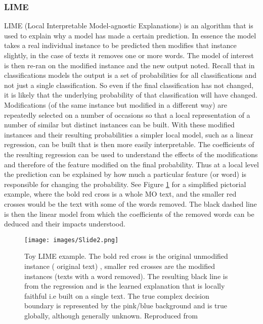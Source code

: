 \subsubsection{LIME} LIME (Local Interpretable Model-agnostic Explanations) \parencite{ribeiro2016should} is an algorithm that is used to explain why a model has made a certain prediction. In essence the model takes a real individual instance to be predicted then modifies that instance slightly, in the case of texts it removes one or more words. The model of interest is then re-ran on the modified instance and the new output noted. Recall that in classifications models the output is a set of probabilities for all classifications and not just a single classification. So even if the final classification has not changed, it is likely that the underlying probability of that classification will have changed. Modifications (of the same instance but modified in a different way) are repeatedly selected on a number of occasions so that a local representation of a number of similar but distinct instances can be built. With these modified instances and their resulting probabilities a simpler local model, such as a linear regression, can be built that is then more easily interpretable. The coefficients of the resulting regression can be used to understand the effects of the modifications and therefore of the feature modified on the final probability. Thus at a local level the prediction can be explained by how much a particular feature (or word) is responsible for changing the probability. See Figure \ref{fig:LIME} for a simplified pictorial example, where the bold red cross is a whole MO text, and the smaller red crosses would be the text with some of the words removed. The black dashed line is then the linear model from which the coefficients of the removed words can be deduced and their impacts understood.
\begin{figure}[!tbp]
  \centering
    \texttt{[image: images/Slide2.png]}
    \caption[Toy LIME example.]{ Toy LIME example. The bold red cross is the original unmodified instance ( original text) , smaller red crosses are the modified instances (texts with a word removed). The resulting black line is from the regression and is the learned explanation that is locally faithful i.e built on a single text. The true complex decision boundary is represented by the pink/blue background and is true globally, although generally unknown. Reproduced from \parencite{ribeiro2016should} }
    \label{fig:LIME}
\end{figure}


